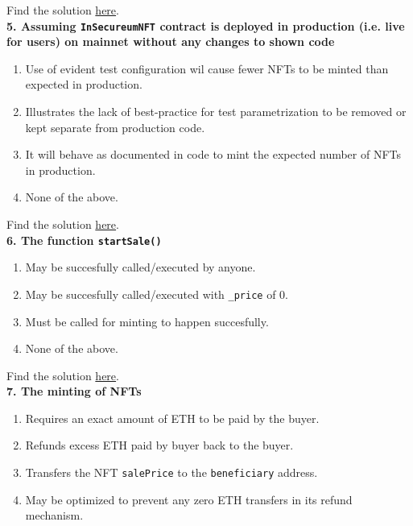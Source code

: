 Find the solution \hyperref[sec:exam8_q4]{here}.\\

\textbf{5. Assuming \texttt{InSecureumNFT} contract is deployed in production (i.e. live for users) on mainnet without any changes to shown code}

\begin{enumerate}[label=\Alph*.]
    \item Use of evident test configuration wil cause fewer NFTs to be minted than expected in production.
    \item Illustrates the lack of best-practice for test parametrization to be removed or kept separate from production code.
    \item It will behave as documented in code to mint the expected number of NFTs in production.
    \item None of the above.
\end{enumerate}

Find the solution \hyperref[sec:exam8_q5]{here}.\\

\textbf{6. The function \texttt{startSale()}}

\begin{enumerate}[label=\Alph*.]
    \item May be succesfully called/executed by anyone.
    \item May be succesfully called/executed with \verb|_price| of 0.
    \item Must be called for minting to happen succesfully.
    \item None of the above.
\end{enumerate}

Find the solution \hyperref[sec:exam8_q6]{here}.\\

\textbf{7. The minting of NFTs}

\begin{enumerate}[label=\Alph*.]
    \item Requires an exact amount of ETH to be paid by the buyer.
    \item Refunds excess ETH paid by buyer back to the buyer.
    \item Transfers the NFT \verb|salePrice| to the \verb|beneficiary| address.
    \item May be optimized to prevent any zero ETH transfers in its refund mechanism.
\end{enumerate}

